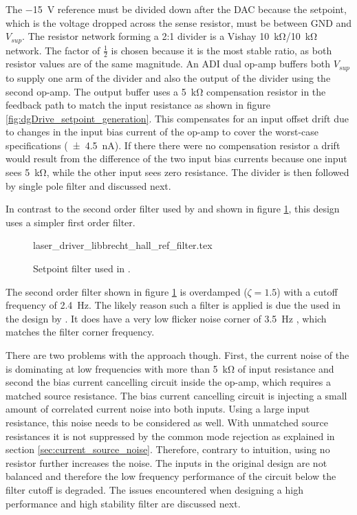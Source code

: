 The \qty{-15}{\V} reference must be divided down after the DAC because the setpoint, which is the voltage dropped across the sense resistor, must be between GND and $V_{sup}$. The resistor network forming a 2:1 divider is a Vishay  \qty{10}{\kilo\ohm}/\qty{10}{\kilo\ohm} network. The factor of $\frac{1}{2}$ is chosen because it is the most stable ratio, as both resistor values are of the same magnitude. An ADI  \cite{datasheet_AD8676} dual op-amp buffers both $V_{sup}$ to supply one arm of the divider and also the output of the divider using the second op-amp. The output buffer uses a \qty{5}{\kilo\ohm} compensation resistor in the feedback path to match the input resistance as shown in figure \ref{fig:dgDrive_setpoint_generation}. This compensates for an input offset drift due to changes in the input bias current of the op-amp to cover the worst-case specifications (\qty{\pm 4.5}{\nA}). If there there were no compensation resistor a drift would result from the difference of the two input bias currents because one input sees \qty{5}{\kilo\ohm}, while the other input sees zero resistance. The divider is then followed by single pole filter and discussed next.

In contrast to the second order filter used by \cite{laser_driver_digital,laser_driver_mosfet_noise,libbrecht_hall} and shown in figure \ref{fig:setpoint_filter_libbrecht_hall}, this design uses a simpler first order filter.
\begin{figure}[ht]
    \centering
        {laser_driver_libbrecht_hall_ref_filter.tex}
    \caption{Setpoint filter used in \cite{laser_driver_digital,laser_driver_mosfet_noise,libbrecht_hall}.}
    \label{fig:setpoint_filter_libbrecht_hall}
\end{figure}

The second order filter shown in figure \ref{fig:setpoint_filter_libbrecht_hall} is overdamped ($\zeta = 1.5$) with a cutoff frequency of \qty{2.4}{\Hz}. The likely reason such a filter is applied is due the  used in the design by \citeauthor{libbrecht_hall} \cite{libbrecht_hall}. It does have a very low flicker noise corner of \qty{3.5}{\Hz} \cite{datasheet_LT1028}, which matches the filter corner frequency.

There are two problems with the approach though. First, the current noise of the  is dominating at low frequencies with more than \qty{5}{\kilo\ohm} of input resistance and second the bias current cancelling circuit inside the op-amp, which requires a matched source resistance. The bias current cancelling circuit is injecting a small amount of correlated current noise into both inputs. Using a large input resistance, this noise needs to be considered as well. With unmatched source resistances it is not suppressed by the common mode rejection as explained in section \ref{sec:current_source_noise}. Therefore, contrary to intuition, using no resistor further increases the noise. The inputs in the original design are not balanced and therefore the low frequency performance of the circuit below the filter cutoff is degraded. The issues encountered when designing a high performance and high stability filter are discussed next.


